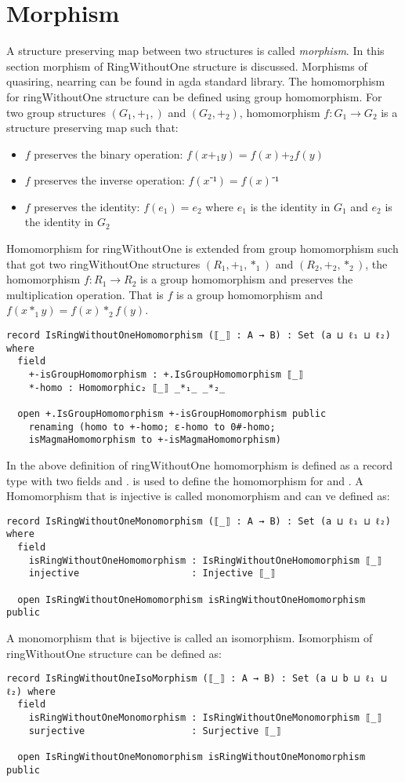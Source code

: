 \section{Morphism} 
A structure preserving map between two structures is called \textit{morphism}.
In this section morphism of RingWithoutOne structure is discussed. Morphisms of
quasiring, nearring can be found in agda standard library. The homomorphism for
ringWithoutOne structure can be defined using group homomorphism. For two group
structures $(G_1,+_1,)$ and $(G_2,+_2)$, homomorphism $f:G_1 \rightarrow G_2$ is
a structure preserving map such that:
\begin{itemize}
  \item $f$ preserves the binary operation: $f(x +_1 y) = f(x) +_2 f(y)$
  \item $f$ preserves the inverse operation: $f(x⁻¹) = f(x)⁻¹$
  \item $f$ preserves the identity: $f(e_1) = e_2$ where $e_1$ is the identity
  in $G_1$ and $e_2$ is the identity in $G_2$
\end{itemize}
Homomorphism for ringWithoutOne is extended from group homomorphism such that
got two ringWithoutOne structures $(R_1,+_1,*_1)$ and $(R_2,+_2,*_2)$, the
homomorphism $f: R_1 \rightarrow R_2$ is a group homomorphism and preserves the
multiplication operation. That is $f$ is a group homomorphism and \(f(x *_1 y) =
f(x) *_2 f(y)\).
\begin{verbatim}
record IsRingWithoutOneHomomorphism (⟦_⟧ : A → B) : Set (a ⊔ ℓ₁ ⊔ ℓ₂) where
  field
    +-isGroupHomomorphism : +.IsGroupHomomorphism ⟦_⟧
    *-homo : Homomorphic₂ ⟦_⟧ _*₁_ _*₂_

  open +.IsGroupHomomorphism +-isGroupHomomorphism public
    renaming (homo to +-homo; ε-homo to 0#-homo;
    isMagmaHomomorphism to +-isMagmaHomomorphism)
\end{verbatim} 
In the above definition of ringWithoutOne homomorphism
 is defined as a record type with two
fields  and . 
is used to define the homomorphism for  and . A
Homomorphism that is injective is called monomorphism and can ve defined as:
\begin{verbatim}
record IsRingWithoutOneMonomorphism (⟦_⟧ : A → B) : Set (a ⊔ ℓ₁ ⊔ ℓ₂) where
  field
    isRingWithoutOneHomomorphism : IsRingWithoutOneHomomorphism ⟦_⟧
    injective                    : Injective ⟦_⟧

  open IsRingWithoutOneHomomorphism isRingWithoutOneHomomorphism public
\end{verbatim}
A monomorphism that is bijective is called an isomorphism. Isomorphism of
ringWithoutOne structure can be defined as:
\begin{verbatim}
record IsRingWithoutOneIsoMorphism (⟦_⟧ : A → B) : Set (a ⊔ b ⊔ ℓ₁ ⊔ ℓ₂) where
  field
    isRingWithoutOneMonomorphism : IsRingWithoutOneMonomorphism ⟦_⟧
    surjective                   : Surjective ⟦_⟧

  open IsRingWithoutOneMonomorphism isRingWithoutOneMonomorphism public
\end{verbatim}
